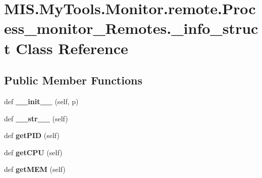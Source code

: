 \hypertarget{classMIS_1_1MyTools_1_1Monitor_1_1remote_1_1Process__monitor__Remotes_1_1__info__struct}{}\section{M\+I\+S.\+My\+Tools.\+Monitor.\+remote.\+Process\+\_\+monitor\+\_\+\+Remotes.\+\_\+info\+\_\+struct Class Reference}
\label{classMIS_1_1MyTools_1_1Monitor_1_1remote_1_1Process__monitor__Remotes_1_1__info__struct}
\subsection*{Public Member Functions}
\begin{DoxyCompactItemize}
\item 
\mbox{\label{classMIS_1_1MyTools_1_1Monitor_1_1remote_1_1Process__monitor__Remotes_1_1__info__struct_ac8ca616146e500b8de64554d6ba0f25d}} 
def {\bfseries \+\_\+\+\_\+init\+\_\+\+\_\+} (self, p)
\item 
\mbox{\label{classMIS_1_1MyTools_1_1Monitor_1_1remote_1_1Process__monitor__Remotes_1_1__info__struct_aecc9a61814a2bc9b9b0a2f3db7d2c490}} 
def {\bfseries \+\_\+\+\_\+str\+\_\+\+\_\+} (self)
\item 
\mbox{\label{classMIS_1_1MyTools_1_1Monitor_1_1remote_1_1Process__monitor__Remotes_1_1__info__struct_a41dbacf65c7d2e34df9868b04940462e}} 
def {\bfseries get\+P\+ID} (self)
\item 
\mbox{\label{classMIS_1_1MyTools_1_1Monitor_1_1remote_1_1Process__monitor__Remotes_1_1__info__struct_aef457a0d7a4aa2ac6a767ccd89c96a6a}} 
def {\bfseries get\+C\+PU} (self)
\item 
\mbox{\label{classMIS_1_1MyTools_1_1Monitor_1_1remote_1_1Process__monitor__Remotes_1_1__info__struct_aaa2d2a731c7660e20a44ce1c9755c80b}} 
def {\bfseries get\+M\+EM} (self)
\end{DoxyCompactItemize}
